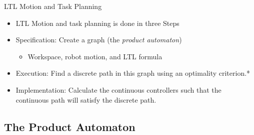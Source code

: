 \documentclass{beamer}
\begin{document}
\begin{frame}{LTL Motion and Task Planning}
	\begin{itemize}	
	\item {
		LTL Motion and task planning is done in three Steps \cite{belta07}
		\pause
	}
	\item<2->{
		Specification: Create a graph (the \textit{product automaton}) 
		\begin{itemize}
			\item Workspace, robot motion, and LTL formula
		\end{itemize}
	}
	\item<3->{
		Execution: Find a discrete path in this graph using an optimality criterion.*
	}
	\item<4->{
		Implementation: Calculate the continuous controllers such that the continuous path will satisfy the discrete path.
	}
	\end{itemize}	
	
\end{frame}
\subsection{The Product Automaton}
\end{document}
